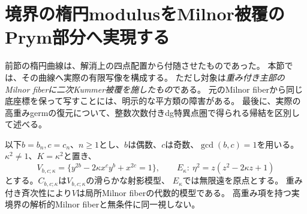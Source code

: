 \section{境界の楕円modulusをMilnor被覆のPrym部分へ実現する}
\label{sec:boundary-milnor-prym}
前節の楕円曲線は、解消上の四点配置から付随させたものであった。
本節では、その曲線へ実際の有限写像を構成する。
ただし対象は\emph{重み付き主部のMilnor fiberに二次Kummer被覆を施したもの}である。
元のMilnor fiberから同じ底座標を保って写すことには、明示的な平方類の障害がある。
最後に、実際の高重みgermの復元について、整数次数付きdg特異点圏で得られる帰結を区別して述べる。

以下$b=b_n,c=c_n$、$n\ge1$とし、$b$は偶数、$c$は奇数、$\gcd(b,c)=1$を用いる。
$\kappa^2\ne1$、$K=\kappa^2$と置き、
\[
 V_{b,c;\kappa}=\{y^{2b}-2\kappa x^cy^b+x^{2c}=1\},\qquad
 E_\kappa:\ \eta^2=z(z^2-2\kappa z+1)
\]
とする。$C_{b,c;\kappa}$は$V_{b,c;\kappa}$の滑らかな射影模型、
$E_\kappa$では無限遠を原点とする。
重み付き斉次性により$V$は局所Milnor fiberの代数的模型である。
高重み項を持つ実境界の解析的Milnor fiberと無条件に同一視しない。

